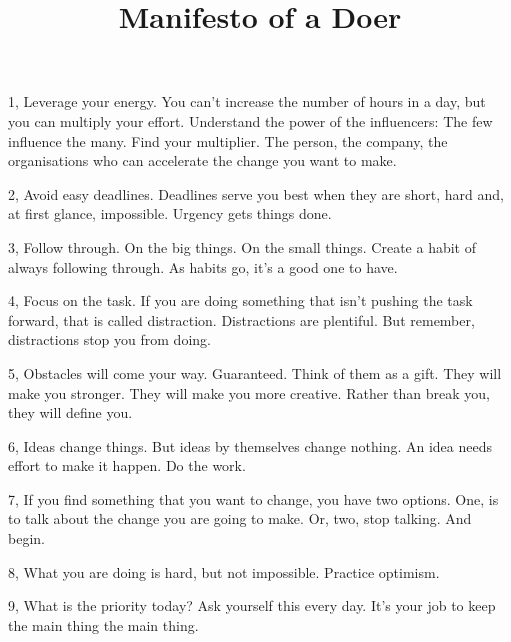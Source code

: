 \documentclass[twocolumn]{article}
\title{Manifesto of a Doer}
\date{\vspace{-5ex}}
\begin{document}
\maketitle
\pagestyle{empty}

\hspace{-4cm}

\Large
\LobsterTwo

\vfill

1, Leverage your energy. You can't increase the number of hours in a day, but you can multiply your effort. Understand the power of the influencers: The few influence the many. Find your multiplier. The person, the company, the organisations who can accelerate the change you want to make.

\vfill

2, Avoid easy deadlines. Deadlines serve you best when they are short, hard and, at first glance, impossible. Urgency gets things done.

\vfill

3, Follow through. On the big things. On the small things. Create a habit of always following through. As habits go, it's a good one to have.

\vfill

4, Focus on the task. If you are doing something that isn't pushing the task forward, that is called distraction. Distractions are plentiful. But remember, distractions stop you from doing.

\vfill

5, Obstacles will come your way. Guaranteed. Think of them as a gift. They will make you stronger. They will make you more creative. Rather than break you, they will define you.

\vfill

6, Ideas change things. But ideas by themselves change nothing. An idea needs effort to make it happen. Do the work.

\vfill

7, If you find something that you want to change, you have two options. One, is to talk about the change you are going to make. Or, two, stop talking. And begin.

\vfill

8, What you are doing is hard, but not impossible. Practice optimism.

\vfill

9, What is the priority today? Ask yourself this every day. It's your job to keep the main thing the main thing.
\end{document}
